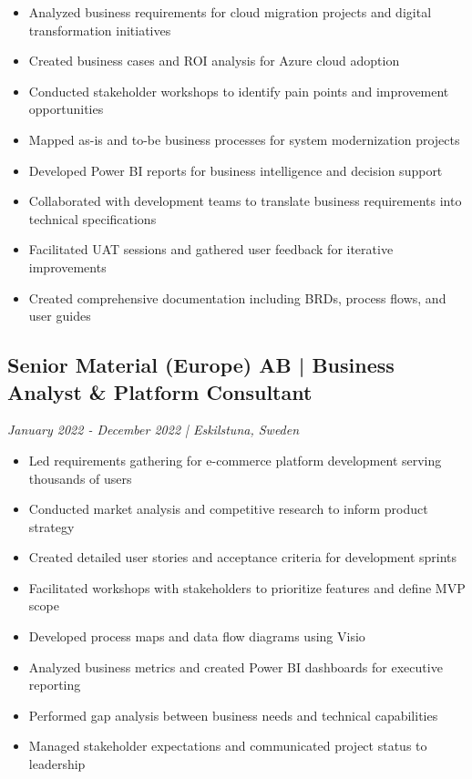 \documentclass[11pt,a4paper]{article}
\begin{document}
\begin{itemize}[leftmargin=*, itemsep=2pt]
\item Analyzed business requirements for cloud migration projects and digital transformation initiatives
\item Created business cases and ROI analysis for Azure cloud adoption
\item Conducted stakeholder workshops to identify pain points and improvement opportunities
\item Mapped as-is and to-be business processes for system modernization projects
\item Developed Power BI reports for business intelligence and decision support
\item Collaborated with development teams to translate business requirements into technical specifications
\item Facilitated UAT sessions and gathered user feedback for iterative improvements
\item Created comprehensive documentation including BRDs, process flows, and user guides
\end{itemize}

\subsection*{Senior Material (Europe) AB | Business Analyst \& Platform Consultant}
\textit{January 2022 - December 2022 | Eskilstuna, Sweden}

\begin{itemize}[leftmargin=*, itemsep=2pt]
\item Led requirements gathering for e-commerce platform development serving thousands of users
\item Conducted market analysis and competitive research to inform product strategy
\item Created detailed user stories and acceptance criteria for development sprints
\item Facilitated workshops with stakeholders to prioritize features and define MVP scope
\item Developed process maps and data flow diagrams using Visio
\item Analyzed business metrics and created Power BI dashboards for executive reporting
\item Performed gap analysis between business needs and technical capabilities
\item Managed stakeholder expectations and communicated project status to leadership
\end{itemize}
\end{document}
